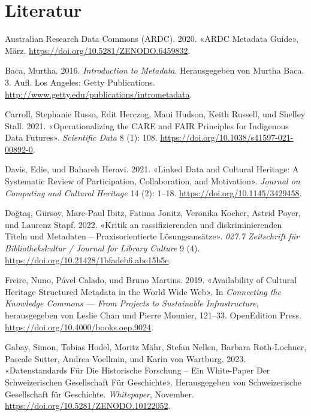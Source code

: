 \documentclass[
  letterpaper,
  DIV=11,
  numbers=noendperiod,
  landscape,
  a4paper,
  geometry:margin=1in]{scrartcl}
\newlength{\cslhangindent}
\newenvironment{CSLReferences}[2] %
 {\begin{list}{}{%
  \setlength{\itemindent}{0pt}
  \setlength{\leftmargin}{0pt}
  \setlength{\parsep}{0pt}
  \ifodd #1
   \setlength{\leftmargin}{\cslhangindent}
   \setlength{\itemindent}{-1\cslhangindent}
  \fi
  \setlength{\itemsep}{#2\baselineskip}}}
 {\end{list}}
\begin{document}
\section{Literatur}\label{literatur}

\label{refs}
\begin{CSLReferences}{1}{0}
Australian Research Data Commons (ARDC). 2020. {«{ARDC Metadata
Guide}»}, März. \url{https://doi.org/10.5281/ZENODO.6459832}.

Baca, Murtha. 2016. \emph{Introduction to Metadata}. Herausgegeben von
Murtha Baca. 3. Aufl. Los Angeles: Getty Publications.
\url{http://www.getty.edu/publications/intrometadata}.

Carroll, Stephanie Russo, Edit Herczog, Maui Hudson, Keith Russell, und
Shelley Stall. 2021. {«Operationalizing the {CARE} and {FAIR Principles}
for {Indigenous} Data Futures»}. \emph{Scientific Data} 8 (1): 108.
\url{https://doi.org/10.1038/s41597-021-00892-0}.

Davis, Edie, und Bahareh Heravi. 2021. {«Linked {Data} and {Cultural
Heritage}: {A Systematic Review} of {Participation}, {Collaboration},
and {Motivation}»}. \emph{Journal on Computing and Cultural Heritage} 14
(2): 1--18. \url{https://doi.org/10.1145/3429458}.

Doğtaş, Gürsoy, Marc-Paul Ibitz, Fatima Jonitz, Veronika Kocher, Astrid
Poyer, und Laurenz Stapf. 2022. {«Kritik an rassifizierenden und
diskriminierenden Titeln und Metadaten -- Praxisorientierte
Lösungsansätze»}. \emph{027.7 Zeitschrift für Bibliothekskultur /
Journal for Library Culture} 9 (4).
\url{https://doi.org/10.21428/1bfadeb6.abe15b5e}.

Freire, Nuno, Pável Calado, und Bruno Martins. 2019. {«Availability of
{Cultural Heritage Structured Metadata} in the {World Wide Web}»}. In
\emph{Connecting the {Knowledge Commons} --- {From Projects} to
{Sustainable Infrastructure}}, herausgegeben von Leslie Chan und Pierre
Mounier, 121--33. OpenEdition Press.
\url{https://doi.org/10.4000/books.oep.9024}.

Gabay, Simon, Tobias Hodel, Moritz Mähr, Stefan Nellen, Barbara
Roth-Lochner, Pascale Sutter, Andrea Voellmin, und Karin von Wartburg.
2023. {«Datenstandards Für Die Historische {Forschung} -- {Ein
White-Paper} Der {Schweizerischen Gesellschaft} Für {Geschichte}»}.
Herausgegeben von Schweizerische Gesellschaft für Geschichte.
\emph{Whitepaper}, November.
\url{https://doi.org/10.5281/ZENODO.10122052}.


\end{CSLReferences}
\end{document}
